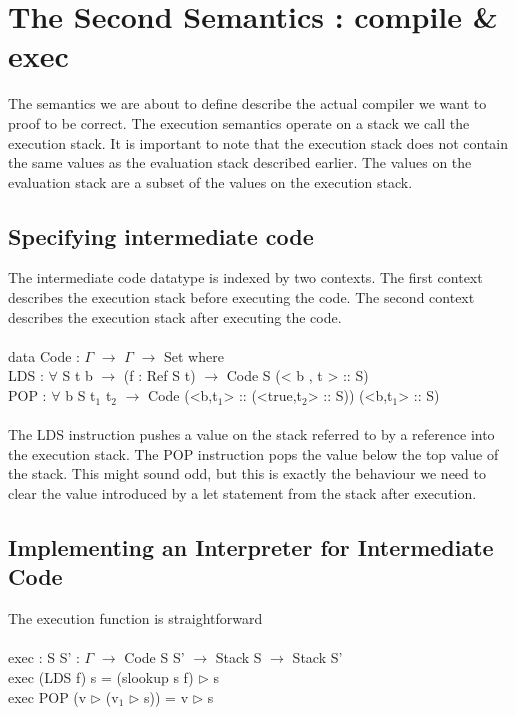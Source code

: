 \documentclass[paper=a4, fontsize=11pt]{scrartcl} %
\numberwithin{equation}{section} %
\numberwithin{figure}{section} %
\numberwithin{table}{section} %
\begin{document}
\section{The Second Semantics : compile \& exec}
The semantics we are about to define describe the actual compiler we want to proof to be correct. The execution semantics operate on a stack we call the execution stack. It is important to note that the execution stack does not contain the same values as the evaluation stack described earlier. The values on the evaluation stack are a subset of the values on the execution stack. 

\subsection{Specifying intermediate code}
The intermediate code datatype is indexed by two contexts. The first context describes the execution stack before executing the code. The second context describes the execution stack after executing the code. \\
\\
\ttfamily
data Code : $\Gamma$ $\rightarrow$ $\Gamma$ $\rightarrow$ Set where\\
\hspace*{5mm}LDS   : $\forall$ {S t b} $\rightarrow$ (f : Ref S t) $\rightarrow$ Code S (< b , t > :: S)\\
\hspace*{5mm}POP   : $\forall$ {b S t$_1$ t$_2$} $\rightarrow$ Code (<b,t$_1$> :: (<true,t$_2$> :: S)) (<b,t$_1$> :: S)\\
\normalfont
\\The \ttfamily LDS \normalfont instruction pushes a value on the stack referred to by a reference into the execution stack. The \ttfamily POP \normalfont instruction pops the value below the top value of the stack. This might sound odd, but this is exactly the behaviour we need to clear the value introduced by a let statement from the stack after execution.

\subsection{Implementing an Interpreter for Intermediate Code}
The execution function is straightforward\\
\\
\ttfamily
exec : {S S' : $\Gamma$} $\rightarrow$ Code S S' $\rightarrow$ Stack S $\rightarrow$ Stack S'\\
exec (LDS f) s = (slookup s f) $\rhd$ s\\
exec POP (v $\rhd$ (v$_1$ $\rhd$ s)) = v $\rhd$ s\\
\normalfont
\end{document}
